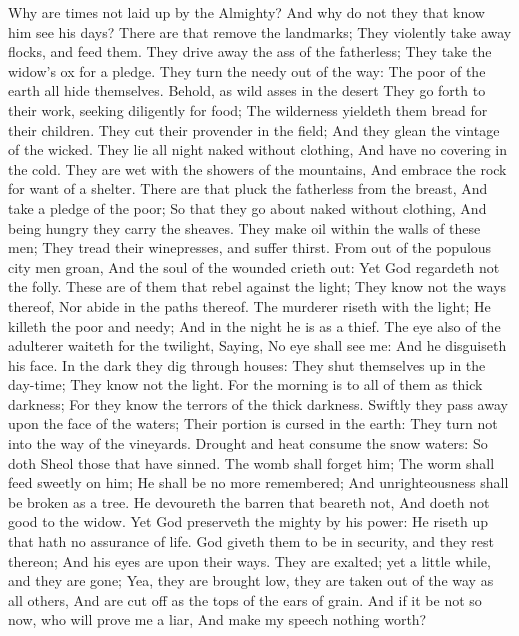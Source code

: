 Why are times not laid up by the Almighty? And why do not they that know him see his days?  There are that remove the landmarks; They violently take away flocks, and feed them.  They drive away the ass of the fatherless; They take the widow’s ox for a pledge.  They turn the needy out of the way: The poor of the earth all hide themselves.  Behold, as wild asses in the desert They go forth to their work, seeking diligently for food; The wilderness yieldeth them bread for their children.  They cut their provender in the field; And they glean the vintage of the wicked.  They lie all night naked without clothing, And have no covering in the cold.  They are wet with the showers of the mountains, And embrace the rock for want of a shelter.  There are that pluck the fatherless from the breast, And take a pledge of the poor;  So that they go about naked without clothing, And being hungry they carry the sheaves.  They make oil within the walls of these men; They tread their winepresses, and suffer thirst.  From out of the populous city men groan, And the soul of the wounded crieth out: Yet God regardeth not the folly.  These are of them that rebel against the light; They know not the ways thereof, Nor abide in the paths thereof.  The murderer riseth with the light; He killeth the poor and needy; And in the night he is as a thief.  The eye also of the adulterer waiteth for the twilight, Saying, No eye shall see me: And he disguiseth his face.  In the dark they dig through houses: They shut themselves up in the day-time; They know not the light.  For the morning is to all of them as thick darkness; For they know the terrors of the thick darkness.  Swiftly they pass away upon the face of the waters; Their portion is cursed in the earth: They turn not into the way of the vineyards.  Drought and heat consume the snow waters: So doth Sheol those that have sinned.  The womb shall forget him; The worm shall feed sweetly on him; He shall be no more remembered; And unrighteousness shall be broken as a tree.  He devoureth the barren that beareth not, And doeth not good to the widow.  Yet God preserveth the mighty by his power: He riseth up that hath no assurance of life.  God giveth them to be in security, and they rest thereon; And his eyes are upon their ways.  They are exalted; yet a little while, and they are gone; Yea, they are brought low, they are taken out of the way as all others, And are cut off as the tops of the ears of grain.  And if it be not so now, who will prove me a liar, And make my speech nothing worth? 

